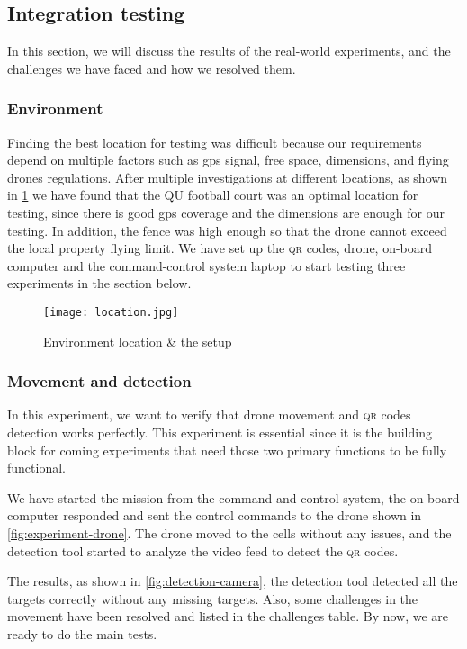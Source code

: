 \documentclass[../main.tex]{subfiles}
\begin{document}
\subsection{Integration testing}
In this section, we will discuss the results of the 
real-world experiments,
and the challenges we have faced and how we resolved them.
\subsubsection{Environment}
Finding the best location for testing was difficult
because our requirements depend on multiple factors 
such as \gls{gps} signal, free space, dimensions,
and flying drones regulations. After multiple investigations
at different locations, as shown in \cref{fig:testing-location}
we have found that
the QU football court was an optimal location
for testing, since there is good \gls{gps} coverage and the dimensions are
enough for our testing. In addition, the fence was high enough so that
the drone cannot exceed the local property flying limit.
We have set up the \textsc{qr} codes, drone, on-board computer and the command-control
system laptop to start testing three experiments in the section below.

\begin{figure}[H]
	\centering
	\texttt{[image: location.jpg]}
	\caption{Environment location \& the setup}
	\label{fig:testing-location}
\end{figure} 
\subsubsection{Movement and detection}
In this experiment, we want to verify that drone movement and
\textsc{qr} codes detection works perfectly. This experiment is 
essential since it is the building block for coming experiments
that need those two primary functions to be fully functional.

We have started the mission from the command and control system, 
the on-board computer responded and sent the control commands 
to the drone shown in \cref{fig:experiment-drone}.
The drone moved to the cells without any issues,
and the detection tool started to analyze 
the video feed to detect the \textsc{qr} codes.

The results, as shown in \cref{fig:detection-camera}, 
the detection tool detected all the targets correctly 
without any missing targets. Also, some challenges 
in the movement have been resolved and listed in 
the challenges table. By now, we are ready to do the main tests.
\end{document}
